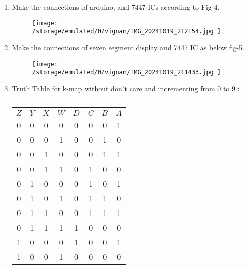 \documentclass[conference]{IEEEtran}
\begin{document}
\begin{enumerate}

\item Make the connections of arduino, and  7447 ICs according to Fig-4.
	\begin{figure}[h] 
	\centering 
	\texttt{[image:   /storage/emulated/0/vignan/IMG\_20241019\_212154.jpg  ]}
	\caption{\label{fig-4:Gates}}    
\end{figure}



\item Make the connections of seven segment display and 7447 IC as below fig-5.

\begin{figure}[h]                           
\centering                                 
\texttt{[image:   /storage/emulated/0/vignan/IMG\_20241019\_211433.jpg    ]}                                           
\caption{\label{fig-5:Gates}}               
\end{figure}


\item {Truth Table for k-map without don't care and incrementing from $0$ to $9$ :  }

\begin{table}[htbp]
    \centering
\begin{tabular}
{ | c | c | c | c | c | c | c | c | } \hline
$Z$ & $Y$ & $X$ & $W$ & $D$ & $C$ & $B$ & $A$\\\hline
0   & 0   & 0   & 0   & 0  & 0 & 0  & 1 \\
0   & 0   & 0   & 1   & 0  & 0 & 1  & 0 \\
0   & 0   & 1   & 0   & 0  & 0 & 1  & 1 \\
0   & 0   & 1   & 1   & 0  & 1 & 0  & 0 \\
0   & 1   & 0   & 0   & 0  & 1 & 0  & 1 \\  
0   & 1   & 0   & 1   & 0  & 1 & 1  & 0 \\
0   & 1   & 1   & 0   & 0  & 1 & 1  & 1 \\  
0   & 1   & 1   & 1   & 1  & 0 & 0  & 0 \\
1   & 0   & 0   & 0   & 1  & 0 & 0  & 1 \\
1   & 0   & 0   & 1   & 0  & 0 & 0  & 0 \\ \hline
\end{tabular}
\vspace{0.1cm}
\caption{\label{tab:widgets}}
\end{table}


\end{enumerate}
\end{document}
